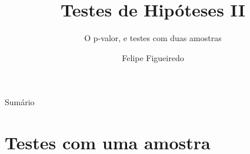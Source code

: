 \documentclass{beamer}
\title%
{Testes de Hipóteses II}
\subtitle
{O p-valor, e testes com duas amostras} %
\author%
{Felipe Figueiredo}%
\institute[INTO] %
{Instituto Nacional de Traumatologia e Ortopedia
}
\date%
{}
\begin{document}
\begin{frame}
  \titlepage
\end{frame}

\begin{frame}{Sumário}
  \tableofcontents
\end{frame}








\section{Testes com uma amostra}
\end{document}
